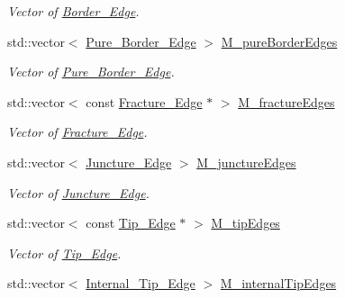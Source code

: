 \begin{DoxyCompactItemize}
\begin{DoxyCompactList}\small\item\em Vector of \hyperlink{classFVCode3D_1_1Rigid__Mesh_1_1Border__Edge}{Border\+\_\+\+Edge}. \end{DoxyCompactList}\item 
std\+::vector$<$ \hyperlink{classFVCode3D_1_1Rigid__Mesh_1_1Pure__Border__Edge}{Pure\+\_\+\+Border\+\_\+\+Edge} $>$ \hyperlink{classFVCode3D_1_1Rigid__Mesh_a72e5bc2acebdc3bca417fa55dfd4c8c0}{M\+\_\+pure\+Border\+Edges}
\begin{DoxyCompactList}\small\item\em Vector of \hyperlink{classFVCode3D_1_1Rigid__Mesh_1_1Pure__Border__Edge}{Pure\+\_\+\+Border\+\_\+\+Edge}. \end{DoxyCompactList}\item 
std\+::vector$<$ const \hyperlink{classFVCode3D_1_1Rigid__Mesh_1_1Fracture__Edge}{Fracture\+\_\+\+Edge} $\ast$ $>$ \hyperlink{classFVCode3D_1_1Rigid__Mesh_af4626d6b92116a3f6e925847f413da2b}{M\+\_\+fracture\+Edges}
\begin{DoxyCompactList}\small\item\em Vector of \hyperlink{classFVCode3D_1_1Rigid__Mesh_1_1Fracture__Edge}{Fracture\+\_\+\+Edge}. \end{DoxyCompactList}\item 
std\+::vector$<$ \hyperlink{classFVCode3D_1_1Rigid__Mesh_1_1Juncture__Edge}{Juncture\+\_\+\+Edge} $>$ \hyperlink{classFVCode3D_1_1Rigid__Mesh_a01850de43f4d5d1dcf617d7697bcf3e8}{M\+\_\+juncture\+Edges}
\begin{DoxyCompactList}\small\item\em Vector of \hyperlink{classFVCode3D_1_1Rigid__Mesh_1_1Juncture__Edge}{Juncture\+\_\+\+Edge}. \end{DoxyCompactList}\item 
std\+::vector$<$ const \hyperlink{classFVCode3D_1_1Rigid__Mesh_1_1Tip__Edge}{Tip\+\_\+\+Edge} $\ast$ $>$ \hyperlink{classFVCode3D_1_1Rigid__Mesh_a973940e6cd68e9980afec97fe94a70f4}{M\+\_\+tip\+Edges}
\begin{DoxyCompactList}\small\item\em Vector of \hyperlink{classFVCode3D_1_1Rigid__Mesh_1_1Tip__Edge}{Tip\+\_\+\+Edge}. \end{DoxyCompactList}\item 
std\+::vector$<$ \hyperlink{classFVCode3D_1_1Rigid__Mesh_1_1Internal__Tip__Edge}{Internal\+\_\+\+Tip\+\_\+\+Edge} $>$ \hyperlink{classFVCode3D_1_1Rigid__Mesh_a15cb042bfb5d94c4ce34f20d1e92ebb5}{M\+\_\+internal\+Tip\+Edges}

\end{DoxyCompactItemize}
